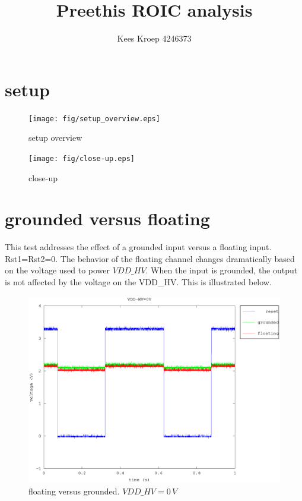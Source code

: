 \documentclass{article}
\title{Preethis ROIC analysis}
\author{Kees Kroep 4246373}
\begin{document}
  \maketitle

\section{setup}\label{sec:setup}




\begin{figure}[h]
	\centering
	\texttt{[image: fig/setup\_overview.eps]}
	\caption{setup overview}
	\label{fig:setup_overview}
\end{figure}

\begin{figure}[h]
	\centering
	\texttt{[image: fig/close-up.eps]}
	\caption{close-up}
	\label{fig:close-up}
\end{figure}

\clearpage
\section{grounded versus floating}
This test addresses the effect of a grounded input versus a floating input. Rst1=Rst2=0.
The behavior of the floating channel changes dramatically based on the voltage used to power $VDD\_HV$. When the input is grounded, the output is not affected by the voltage on the VDD\_HV. This is illustrated below.

\begin{figure}[H]
	\centering
	\includegraphics[width=0.8\linewidth]{fig/g_f_0V.eps}
	\caption{floating versus grounded. $VDD\_HV=0\,V$}
	\label{fig:g_f_0V}
\end{figure}
\end{document}
